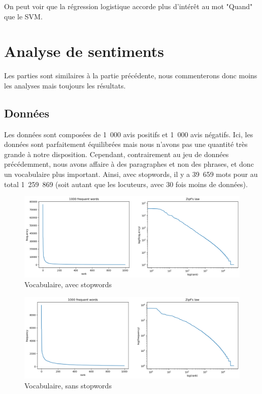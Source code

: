 \documentclass{article}
\begin{document}
On peut voir que la régression logistique accorde plus d'intérêt au mot "Quand" que le SVM.






\section{Analyse de sentiments}

Les parties sont similaires à la partie précédente, nous commenterons donc moins les analyses mais toujours les résultats.

\subsection{Données}

Les données sont composées de 1~000 avis positifs et 1~000 avis négatifs. Ici, les données sont parfaitement équilibrées mais nous n'avons pas une quantité très grande à notre disposition. Cependant, contrairement au jeu de données précédemment, nous avons affaire à des paragraphes et non des phrases, et donc un vocabulaire plus important. Ainsi, avec stopwords, il y a 39~659 mots pour au total 1~259~869 (soit autant que les locuteurs, avec 30 fois moins de données).

\begin{figure}[H]
    \centering
    \includegraphics[width=\textwidth]{./src/movies/zipfs_nostopwords.png}
    \caption{Vocabulaire, avec stopwords}
    \label{zipfs_nostopwords_movies}
\end{figure}

\begin{figure}[H]
    \includegraphics[width=\textwidth]{./src/movies/zipfs_stopwords.png} 
    \caption{Vocabulaire, sans stopwords}
    \label{zipfs_stopwords_movies}
\end{figure}
\end{document}
